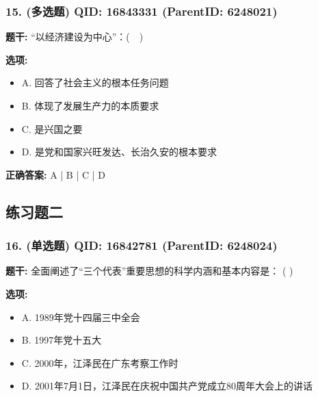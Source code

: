 \documentclass[12pt,UTF8]{ctexart}
\begin{document}
\subsubsection*{15. (多选题) \small QID: 16843331 (ParentID: 6248021)}

\textbf{题干:}
“以经济建设为中心”：(  )



\textbf{选项:}
\begin{itemize}[leftmargin=*]

  \item A. 回答了社会主义的根本任务问题

  \item B. 体现了发展生产力的本质要求

  \item C. 是兴国之要

  \item D. 是党和国家兴旺发达、长治久安的根本要求

\end{itemize}

\textbf{正确答案:}
A | B | C | D

\vspace{0.3em}\hrulefill\vspace{0.7em}

\subsection*{练习题二}

\subsubsection*{16. (单选题) \small QID: 16842781 (ParentID: 6248024)}

\textbf{题干:}
全面阐述了“三个代表”重要思想的科学内涵和基本内容是： ( )



\textbf{选项:}
\begin{itemize}[leftmargin=*]

  \item A. 1989年党十四届三中全会

  \item B. 1997年党十五大

  \item C. 2000年，江泽民在广东考察工作时

  \item D. 2001年7月1日，江泽民在庆祝中国共产党成立80周年大会上的讲话

\end{itemize}
\end{document}
